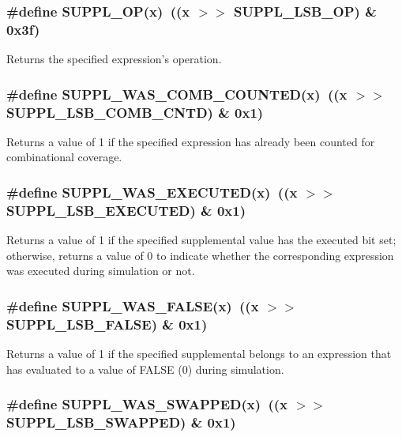 \subsubsection{\setlength{\rightskip}{0pt plus 5cm}\#define SUPPL\_\-OP(x)\ ((x $>$$>$ SUPPL\_\-LSB\_\-OP) \& 0x3f)}\label{group__expr__suppl_a33}


Returns the specified expression's operation. 
\subsubsection{\setlength{\rightskip}{0pt plus 5cm}\#define SUPPL\_\-WAS\_\-COMB\_\-COUNTED(x)\ ((x $>$$>$ SUPPL\_\-LSB\_\-COMB\_\-CNTD) \& 0x1)}\label{group__expr__suppl_a32}


Returns a value of 1 if the specified expression has already been counted for combinational coverage. 
\subsubsection{\setlength{\rightskip}{0pt plus 5cm}\#define SUPPL\_\-WAS\_\-EXECUTED(x)\ ((x $>$$>$ SUPPL\_\-LSB\_\-EXECUTED) \& 0x1)}\label{group__expr__suppl_a22}


Returns a value of 1 if the specified supplemental value has the executed bit set; otherwise, returns a value of 0 to indicate whether the corresponding expression was executed during simulation or not. 
\subsubsection{\setlength{\rightskip}{0pt plus 5cm}\#define SUPPL\_\-WAS\_\-FALSE(x)\ ((x $>$$>$ SUPPL\_\-LSB\_\-FALSE) \& 0x1)}\label{group__expr__suppl_a29}


Returns a value of 1 if the specified supplemental belongs to an expression that has evaluated to a value of FALSE (0) during simulation. 
\subsubsection{\setlength{\rightskip}{0pt plus 5cm}\#define SUPPL\_\-WAS\_\-SWAPPED(x)\ ((x $>$$>$ SUPPL\_\-LSB\_\-SWAPPED) \& 0x1)}\label{group__expr__suppl_a20}


